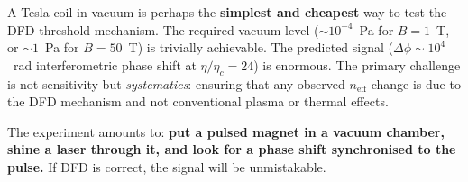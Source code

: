 \documentclass[11pt,a4paper]{article}
\begin{document}
A Tesla coil in vacuum is perhaps the \textbf{simplest and cheapest} way to test
the DFD threshold mechanism. The required vacuum level ($\sim 10^{-4}$~Pa for
$B = 1$~T, or $\sim 1$~Pa for $B = 50$~T) is trivially achievable. The predicted
signal ($\Delta\phi \sim 10^4$~rad interferometric phase shift at $\eta/\eta_c = 24$)
is enormous. The primary challenge is not sensitivity but \emph{systematics}:
ensuring that any observed $n_{\mathrm{eff}}$ change is due to the DFD mechanism
and not conventional plasma or thermal effects.

The experiment amounts to: \textbf{put a pulsed magnet in a vacuum chamber,
shine a laser through it, and look for a phase shift synchronised to the pulse.}
If DFD is correct, the signal will be unmistakable.
\end{document}

